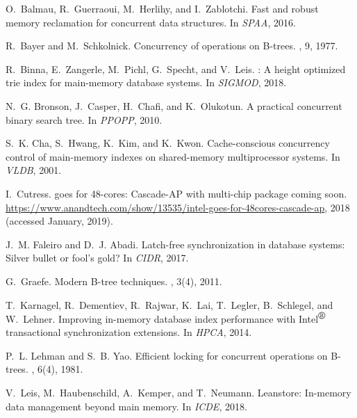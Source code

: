 \documentclass[11pt]{article}
\begin{document}
\begin{thebibliography}{10}

O.~Balmau, R.~Guerraoui, M.~Herlihy, and I.~Zablotchi.
\newblock Fast and robust memory reclamation for concurrent data structures.
\newblock In {\em SPAA}, 2016.

R.~Bayer and M.~Schkolnick.
\newblock Concurrency of operations on {B}-trees.
, 9, 1977.

R.~Binna, E.~Zangerle, M.~Pichl, G.~Specht, and V.~Leis.
: A height optimized trie index for main-memory database
  systems.
\newblock In {\em SIGMOD}, 2018.

N.~G. Bronson, J.~Casper, H.~Chafi, and K.~Olukotun.
\newblock A practical concurrent binary search tree.
\newblock In {\em PPOPP}, 2010.

S.~K. Cha, S.~Hwang, K.~Kim, and K.~Kwon.
\newblock Cache-conscious concurrency control of main-memory indexes on
  shared-memory multiprocessor systems.
\newblock In {\em VLDB}, 2001.

I.~Cutress.
 goes for 48-cores: {Cascade-AP} with multi-chip package
  coming soon.
\newblock
  \url{https://www.anandtech.com/show/13535/intel-goes-for-48cores-cascade-ap},
  2018 (accessed January, 2019).

J.~M. Faleiro and D.~J. Abadi.
\newblock Latch-free synchronization in database systems: Silver bullet or
  fool's gold?
\newblock In {\em CIDR}, 2017.

G.~Graefe.
\newblock Modern {B}-tree techniques.
, 3(4), 2011.

T.~Karnagel, R.~Dementiev, R.~Rajwar, K.~Lai, T.~Legler, B.~Schlegel, and
  W.~Lehner.
\newblock Improving in-memory database index performance with
  {Intel}\({}^{\mbox{{\textregistered}}}\) transactional synchronization
  extensions.
\newblock In {\em HPCA}, 2014.

P.~L. Lehman and S.~B. Yao.
\newblock Efficient locking for concurrent operations on {B}-trees.
, 6(4), 1981.

V.~Leis, M.~Haubenschild, A.~Kemper, and T.~Neumann.
\newblock Leanstore: In-memory data management beyond main memory.
\newblock In {\em ICDE}, 2018.


\end{thebibliography}
\end{document}
